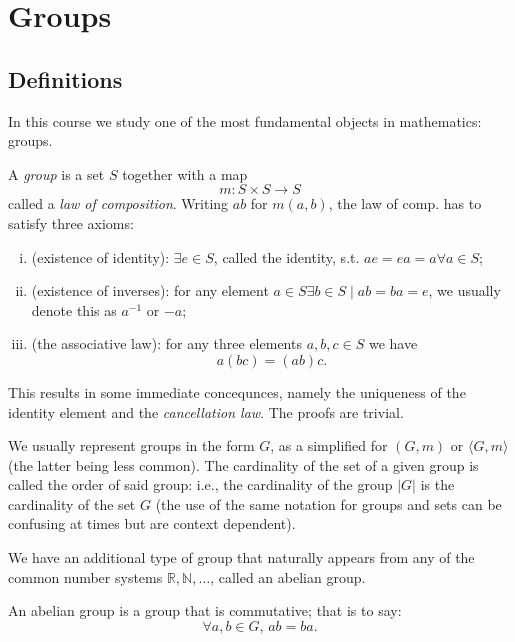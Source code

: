 \documentclass{report}
\begin{document}

\section{Groups}

\subsection{Definitions}

In this course we study one of the most fundamental objects in mathematics: groups. 

\begin{definition}
  A \textit{group} is a set \( S \) together with a map
  \begin{displaymath}
    m: S\times S \to  S
  \end{displaymath}
  called a \textit{law of composition}. Writing \( ab \) for \( m(a,b) \), the law of comp. has to satisfy three axioms:
  \begin{enumerate}[i.]
    \item (existence of identity): \( \exists e \in  S \), called the identity, s.t. \( ae=ea=a \forall a\in S \);
    \item (existence of inverses): for any element \( a \in S \exists b \in  S \mid  ab=ba=e\), we usually denote this as \( a^{-1} \) or \( -a \);
    \item (the associative law): for any three elements \( a,b,c \in  S \) we have \[
      a(bc)=(ab)c
    .\] 
  \end{enumerate}
\end{definition}

This results in some immediate concequnces, namely the uniqueness of the identity element and the \textit{cancellation law}. The proofs are trivial. 

We usually represent groups in the form \( G \), as a simplified for \( (G,m) \) or \( \langle G,m \rangle \) (the latter being less common). The cardinality of the set of a given group is called the order of said group: i.e., the cardinality of the group \( |G| \) is the cardinality of the set \( G \) (the use of the same notation for groups and sets can be confusing at times but are context dependent). 

We have an additional type of group that naturally appears from any of the common number systems \( \mathbb{R},\mathbb{N},\ldots  \), called an abelian group.

\begin{definition}
  An abelian group is a group that is commutative; that is to say:
  \begin{displaymath}
    \forall a,b \in  G, \, ab=ba.
  \end{displaymath}
  
\end{definition}
\end{document}
